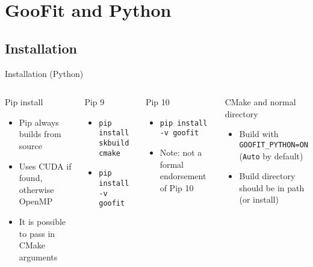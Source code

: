 \documentclass[aspectratio=169, smaller]{beamer}
\begin{document}
\section{GooFit and Python}
\subsection{Installation}
\begin{frame}{Installation (Python)}

    \begin{columns}[c]
        \begin{block}{Pip install}
            \begin{itemize}
                \item Pip always builds from source
                \item Uses CUDA if found, otherwise OpenMP
                \item It is possible to pass in CMake arguments
            \end{itemize}
        \end{block}

        \begin{block}{Pip 9}
            \begin{itemize}
                \item \texttt{pip install skbuild cmake}
                \item \texttt{pip install -v goofit}
            \end{itemize}
        \end{block}

        \begin{block}{Pip 10}
            \begin{itemize}
                \item \texttt{pip install -v goofit}
                \item Note: not a formal endorsement of Pip 10
            \end{itemize}
        \end{block}


        \begin{block}{CMake and normal directory}
            \begin{itemize}
                \item Build with \texttt{GOOFIT\_PYTHON=ON} (\texttt{Auto} by default)
                \item Build directory should be in path (or install)
            \end{itemize}
        \end{block}
    \end{columns}
\end{frame}
\end{document}
